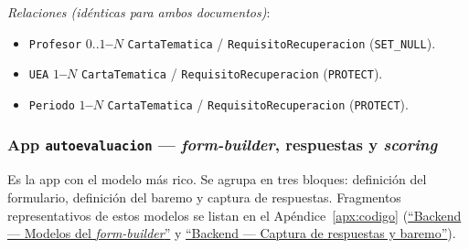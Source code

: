 \emph{Relaciones (idénticas para ambos documentos)}:
\begin{itemize}
    \item \texttt{Profesor} \textbf{$0..1$--$N$} \texttt{CartaTematica} / \texttt{RequisitoRecuperacion} (\texttt{SET\_NULL}).
    \item \texttt{UEA} \textbf{$1$--$N$} \texttt{CartaTematica} / \texttt{RequisitoRecuperacion} (\texttt{PROTECT}).
    \item \texttt{Periodo} \textbf{$1$--$N$} \texttt{CartaTematica} / \texttt{RequisitoRecuperacion} (\texttt{PROTECT}).
\end{itemize}

\subsubsection*{App \texttt{autoevaluacion} --- \emph{form-builder}, respuestas y \emph{scoring}}

Es la app con el modelo más rico. Se agrupa en tres bloques: definición del formulario, definición del baremo y captura de respuestas. Fragmentos representativos de estos modelos se listan en el Apéndice~\ref{apx:codigo} (\hyperref[lst:modelos_form_builder]{``Backend --- Modelos del \emph{form-builder}''} y \hyperref[lst:modelos_respuesta]{``Backend --- Captura de respuestas y baremo''}).

